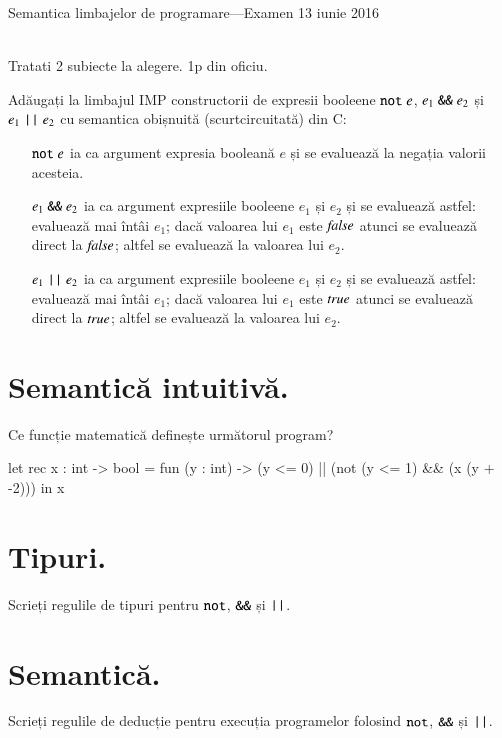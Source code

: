 \documentclass[addpoints,12pt,a4paper,answers]{exam}
\begin{document}
\begin{center}


Semantica limbajelor de programare---Examen \hfill  13 iunie 2016 \\ \ \\

\end{center}


Tratati 2 subiecte la alegere.  1p din oficiu.
\begin{questions}
Adăugați la limbajul IMP constructorii de expresii booleene $\mathrel{\text{\ttfamily not}} e$, $e_1 \mathrel{\text{\ttfamily \&\&}} e_2$ și $e_1 \mathrel{\text{\ttfamily ||}} e_2$ cu semantica obișnuită (scurtcircuitată) din C:
\begin{itemize}
  \item[$\mathrel{\text{\ttfamily not}} e$] ia ca argument expresia booleană $e$ și se evaluează la negația valorii acesteia.
  \item[$e_1 \mathrel{\text{\ttfamily \&\&}} e_2$] ia ca argument expresiile booleene $e_1$ și $e_2$ și se evaluează astfel: evaluează mai întâi $e_1$; dacă valoarea lui $e_1$ este ${\it false}$ atunci se evaluează direct la ${\it false}$; altfel se evaluează la valoarea lui $e_2$.
  \item[$e_1 \mathrel{\text{\ttfamily ||}} e_2$] ia ca argument expresiile booleene $e_1$ și $e_2$ și se evaluează astfel: evaluează mai întâi $e_1$; dacă valoarea lui $e_1$ este ${\it true}$ atunci se evaluează direct la ${\it true}$; altfel se evaluează la valoarea lui $e_2$.
\end{itemize}
\begin{parts}
\part[1] {\bf Semantică intuitivă. } Ce funcție matematică definește următorul program?%
\begin{asciiml}
let rec x : int -> bool = 
  fun (y : int) -> (y <= 0) || (not (y <= 1) && (x (y + -2)))
in x
\end{asciiml}
\part[1] {\bf Tipuri. } Scrieți regulile de tipuri pentru $\mathrel{\text{\ttfamily not}}$, $\mathrel{\text{\ttfamily \&\&}}$ și $\mathrel{\text{\ttfamily ||}}$.
\part[1] {\bf Semantică. } Scrieți regulile de deducție pentru execuția programelor folosind $\mathrel{\text{\ttfamily not}}$, $\mathrel{\text{\ttfamily \&\&}}$ și $\mathrel{\text{\ttfamily ||}}$. 

\end{parts}
\end{questions}
\end{document}
